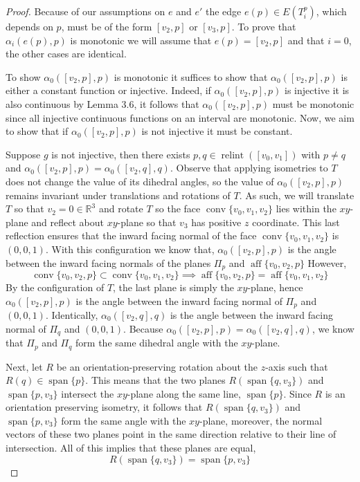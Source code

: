 \documentclass{mainresearch}
\begin{document}
\begin{proof}
	Because of our assumptions on $e$ and $e'$ the edge $e(p)\in E(T_i^p)$, which depends on $p$, must be of the form $[v_2,p]$ or $[v_3,p]$. To prove that $\alpha_i(e(p),p)$ is monotonic we will assume that $e(p) = [v_2,p]$ and that $i=0$, the other cases are identical.
	
	To show $\alpha_0([v_2,p],p)$ is monotonic it suffices to show that $\alpha_0([v_2,p],p)$ is either a constant function or injective. Indeed, if $\alpha_0([v_2,p],p)$ is injective it is also continuous by Lemma 3.6, it follows that $\alpha_0([v_2,p],p)$ must be monotonic since all injective continuous functions on an interval are monotonic. Now, we aim to show that if $\alpha_0([v_2,p],p)$ is not injective it must be constant. 
	
	Suppose $g$ is not injective, then there exists $p,q\in \operatorname{relint}([v_0,v_1])$ with $p\neq q$ and $\alpha_0([v_2,p],p)=\alpha_0([v_2,q],q)$. Observe that applying isometries to $T$ does not change the value of its dihedral angles, so the value of $\alpha_0([v_2,p],p)$ remains invariant under translations and rotations of $T$. As such, we will translate $T$ so that $v_2 = 0 \in \mathbb{R}^3$ and rotate $T$ so the face $\operatorname{conv}\{v_0,v_1,v_2\}$ lies within the $xy$-plane and reflect about $xy$-plane so that $v_3$ has positive $z$ coordinate. This last reflection ensures that the inward facing normal of the face $\operatorname{conv}\{v_0,v_1,v_2\}$ is $(0,0,1)$. With this configuration we know that,
	$\alpha_0([v_2,p],p)$ is the angle between the inward facing normals of the planes $\Pi_p$ and $\operatorname{aff}\{v_0,v_2, p\}$
	However,
	\[
	\operatorname{conv}\{v_0,v_2,p\} \subset \operatorname{conv}\{v_0,v_1,v_2\} \implies \operatorname{aff}\{v_0,v_2, p\} = \operatorname{aff}\{v_0,v_1, v_2\}
	\]
	By the configuration of $T$, the last plane is simply the $xy$-plane, hence $\alpha_0([v_2,p],p)$ is the angle between the inward facing normal of $\Pi_p$ and $(0,0,1)$. Identically, $\alpha_0([v_2,q],q)$ is the angle between the inward facing normal of $\Pi_q$ and $(0,0,1)$. Because $\alpha_0([v_2,p],p)=\alpha_0([v_2,q],q)$, we know that $\Pi_p$ and $\Pi_q$ form the same dihedral angle with the $xy$-plane.
	
	Next, let $R$ be an orientation-preserving rotation about the $z$-axis such that $R(q) \in \operatorname{span}\{p\}$.
	This means that the two planes $R(\operatorname{span}\{q,v_3\})$ and $\operatorname{span}\{p,v_3\}$ intersect the $xy$-plane along the same line, $\operatorname{span}\{p\}$. Since $R$ is an orientation preserving isometry, it follows that $R(\operatorname{span}\{q,v_3\})$ and $\operatorname{span}\{p,v_3\}$ form the same angle with the $xy$-plane, moreover, the normal vectors of these two planes point in the same direction relative to their line of intersection. All of this implies that these planes are equal,
	\[
	R(\operatorname{span}\{q,v_3\}) = \operatorname{span}\{p,v_3\}
	\]
	

\end{proof}
\end{document}
